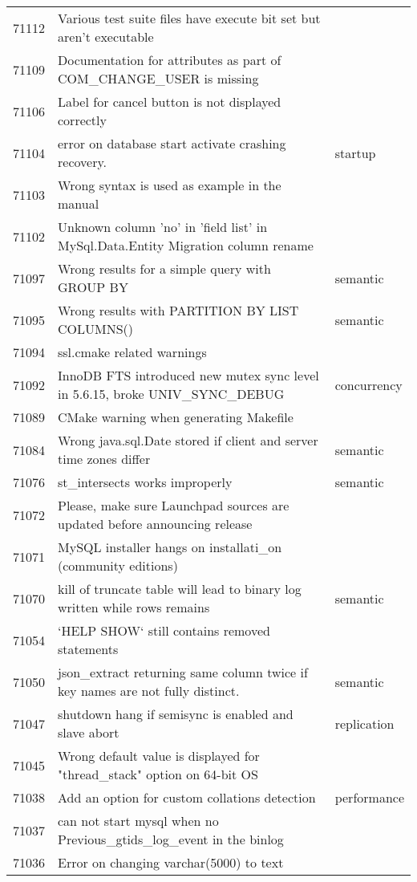 \begin{longtable}[c]{p{1cm}p{10cm}p{1cm}}
71112 & Various test suite files have execute bit set but aren't executable &  \\
71109 & Documentation for attributes as part of COM\_CHANGE\_USER is missing &  \\
71106 & Label for cancel button is not displayed correctly &  \\
71104 & error on database start activate crashing recovery. & startup \\
71103 & Wrong syntax is used as example in the manual &  \\
71102 & Unknown column 'no' in 'field list' in MySql.Data.Entity Migration column rename &  \\
71097 & Wrong results for a simple query with GROUP BY & semantic \\
71095 & Wrong results with PARTITION BY LIST COLUMNS() & semantic \\
71094 & ssl.cmake related warnings &  \\
71092 & InnoDB FTS introduced new mutex sync level in 5.6.15, broke UNIV\_SYNC\_DEBUG & concurrency \\
71089 & CMake warning when generating Makefile &  \\
71084 & Wrong java.sql.Date stored if client and server time zones differ & semantic \\
71076 & st\_intersects works improperly & semantic \\
71072 & Please, make sure Launchpad sources are updated before announcing release &  \\
71071 & MySQL installer hangs on installati\_on (community editions) &  \\
71070 & kill of truncate table will lead to binary log written while rows remains & semantic \\
71054 & `HELP SHOW` still contains removed statements &  \\
71050 & json\_extract returning same column twice if key names are not fully distinct. & semantic \\
71047 & shutdown hang if semisync is enabled and slave abort & replication \\
71045 & Wrong default value is displayed for "thread\_stack" option on 64-bit OS &  \\
71038 & Add an option for custom collations detection & performance \\
71037 & can not start mysql when no Previous\_gtids\_log\_event in the binlog &  \\
71036 & Error on changing varchar(5000) to text &  \\

\end{longtable}
